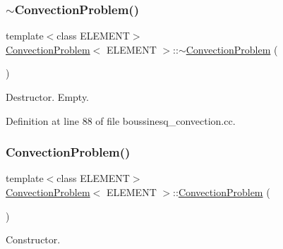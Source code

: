 \subsubsection{\texorpdfstring{$\sim$\+Convection\+Problem()}{~ConvectionProblem()}\hspace{0.1cm}{\footnotesize\ttfamily [1/2]}}
{\footnotesize\ttfamily template$<$class E\+L\+E\+M\+E\+NT$>$ \\
\hyperlink{classConvectionProblem}{Convection\+Problem}$<$ E\+L\+E\+M\+E\+NT $>$\+::$\sim$\hyperlink{classConvectionProblem}{Convection\+Problem} (\begin{DoxyParamCaption}{ }\end{DoxyParamCaption})\hspace{0.3cm}{\ttfamily [inline]}}



Destructor. Empty. 



Definition at line 88 of file boussinesq\+\_\+convection.\+cc.

\mbox{\label{classConvectionProblem_a16bb235fc46c4066134418a2323297c0}} 
\subsubsection{\texorpdfstring{Convection\+Problem()}{ConvectionProblem()}\hspace{0.1cm}{\footnotesize\ttfamily [2/2]}}
{\footnotesize\ttfamily template$<$class E\+L\+E\+M\+E\+NT$>$ \\
\hyperlink{classConvectionProblem}{Convection\+Problem}$<$ E\+L\+E\+M\+E\+NT $>$\+::\hyperlink{classConvectionProblem}{Convection\+Problem} (\begin{DoxyParamCaption}{ }\end{DoxyParamCaption})}



Constructor. 

\mbox{\label{classConvectionProblem_a77c37355ba683b5b1ec11d096ce4d760}} 
